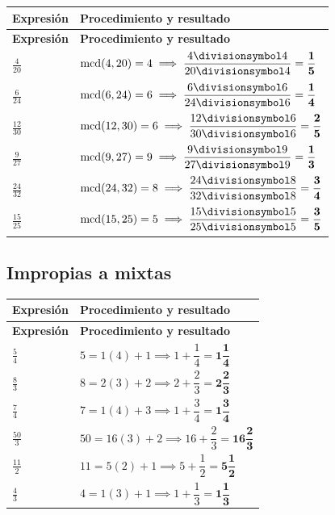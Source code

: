 \documentclass[spanish,letterpaper,oneside]{article}
\let\div\divisionsymbol
\begin{document}
{\small{}\renewcommand{\arraystretch}{1.32}
\begin{longtable}{|>{\raggedright\arraybackslash}p{}|>{\raggedright\arraybackslash}p{}|}\hline
\rowcolor{iiiepePale} \textbf{Expresión} & \textbf{Procedimiento y resultado} \\\hline
\endfirsthead
\hline
\rowcolor{iiiepePale} \textbf{Expresión} & \textbf{Procedimiento y resultado} \\\hline
\endhead
$\frac{4}{20}$ & $\operatorname{mcd}(4,20)=4 \implies \dfrac{4\div 4}{20\div 4}=\mathbf{\dfrac{1}{5}}$ \\\hline
$\frac{6}{24}$ & $\operatorname{mcd}(6,24)=6 \implies \dfrac{6\div 6}{24\div 6}=\mathbf{\dfrac{1}{4}}$ \\\hline
$\frac{12}{30}$ & $\operatorname{mcd}(12,30)=6 \implies \dfrac{12\div 6}{30\div 6}=\mathbf{\dfrac{2}{5}}$ \\\hline
$\frac{9}{27}$ & $\operatorname{mcd}(9,27)=9 \implies \dfrac{9\div 9}{27\div 9}=\mathbf{\dfrac{1}{3}}$ \\\hline
$\frac{24}{32}$ & $\operatorname{mcd}(24,32)=8 \implies \dfrac{24\div 8}{32\div 8}=\mathbf{\dfrac{3}{4}}$ \\\hline
$\frac{15}{25}$ & $\operatorname{mcd}(15,25)=5 \implies \dfrac{15\div 5}{25\div 5}=\mathbf{\dfrac{3}{5}}$ \\\hline
\end{longtable}}

\subsection*{Impropias a mixtas}


{\small{}\renewcommand{\arraystretch}{1.32}
\begin{longtable}{|>{\raggedright\arraybackslash}p{}|>{\raggedright\arraybackslash}p{}|}\hline
\rowcolor{iiiepePale} \textbf{Expresión} & \textbf{Procedimiento y resultado} \\\hline
\endfirsthead
\hline
\rowcolor{iiiepePale} \textbf{Expresión} & \textbf{Procedimiento y resultado} \\\hline
\endhead
$\frac{5}{4}$ & $5 = 1(4)+1 \implies 1+\dfrac{1}{4}=\mathbf{1\dfrac{1}{4}}$ \\\hline
$\frac{8}{3}$ & $8 = 2(3)+2 \implies 2+\dfrac{2}{3}=\mathbf{2\dfrac{2}{3}}$ \\\hline
$\frac{7}{4}$ & $7 = 1(4)+3 \implies 1+\dfrac{3}{4}=\mathbf{1\dfrac{3}{4}}$ \\\hline
$\frac{50}{3}$ & $50 = 16(3)+2 \implies 16+\dfrac{2}{3}=\mathbf{16\dfrac{2}{3}}$ \\\hline
$\frac{11}{2}$ & $11 = 5(2)+1 \implies 5+\dfrac{1}{2}=\mathbf{5\dfrac{1}{2}}$ \\\hline
$\frac{4}{3}$ & $4 = 1(3)+1 \implies 1+\dfrac{1}{3}=\mathbf{1\dfrac{1}{3}}$ \\\hline
\end{longtable}}
\end{document}
